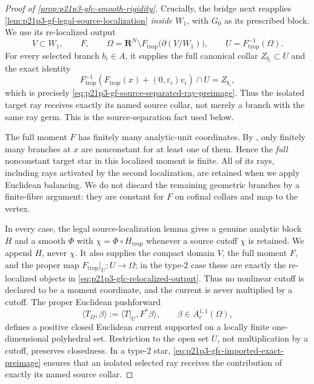 \begin{proof}[Proof of \cref{prop:p21p3-gfc-smooth-rigidity}]
Crucially, the bridge next reapplies
\cref{lem:p21p3-gf-legal-source-localization} \emph{inside $W_1$}, with
$G_0$ as its prescribed block.  We use its re-localized output
\begin{equation}
\label{eq:p21p3-gfc-relocalized-output}
 V\subset W_1,\qquad F,\qquad
 \Omega=\mathbf R^N\setminus
 F_{\mathrm{trop}}\bigl(\partial(V/W_1)\bigr),\qquad
 U=F_{\mathrm{trop}}^{-1}(\Omega).
\end{equation}
For every selected branch $b_i\in A$, it supplies the full canonical collar
$Z_{b_i}\subset U$ and the exact identity
\begin{equation}
\label{eq:p21p3-gfc-imported-exact-preimage}
 F_{\mathrm{trop}}^{-1}\!\left(
 F_{\mathrm{trop}}(x)+(0,\varepsilon_i)v_i\right)\cap U
 =Z_{b_i},
\end{equation}
which is precisely
\eqref{eq:p21p3-gf-source-separated-ray-preimage}.  Thus the isolated
target ray receives exactly its named source collar, not merely a branch
with the same ray germ.  This is the source-separation fact used below.

The full moment $F$ has finitely many analytic-unit coordinates.  By
\cite[Proposition~4.2.4(ii)]{Ducros24CurveStructure}, only finitely many
branches at $x$ are nonconstant for at least one of them.  Hence the
\emph{full} nonconstant target star in this localized moment is finite.
All of its rays, including rays activated by the second localization, are
retained when we apply Euclidean balancing.  We do not discard the
remaining geometric branches by a finite-fibre argument: they are constant
for $F$ on cofinal collars and map to the vertex.

In every case, the legal source-localization lemma gives a genuine analytic
block $H$ and a smooth $\Phi$ with
$\chi=\Phi\circ H_{\mathrm{trop}}$ whenever a source cutoff $\chi$ is
retained.  We append $H$, never $\chi$.  It also supplies the compact
domain $V$, the full moment $F$, and the proper map
$F_{\mathrm{trop}}|_U:U\to\Omega$; in the type-$2$ case these are exactly
the re-localized objects in
\eqref{eq:p21p3-gfc-relocalized-output}.  Thus no nonlinear cutoff is
declared to be a moment coordinate, and the current is never multiplied by
a cutoff.  The proper Euclidean pushforward
\begin{equation}
\label{eq:p21p3-gfc-euclidean-pushforward}
 \langle T_\Omega,\beta\rangle
       :=\langle T|_U,F^*\beta\rangle,
 \qquad \beta\in A_c^{1,1}(\Omega),
\end{equation}
defines a positive closed Euclidean current supported on a locally finite
one-dimensional polyhedral set.  Restriction to the open set $U$, not
multiplication by a cutoff, preserves closedness.  In a type-$2$ star,
\eqref{eq:p21p3-gfc-imported-exact-preimage} ensures that an isolated
selected ray receives the contribution of exactly its named source collar.


\end{proof}
